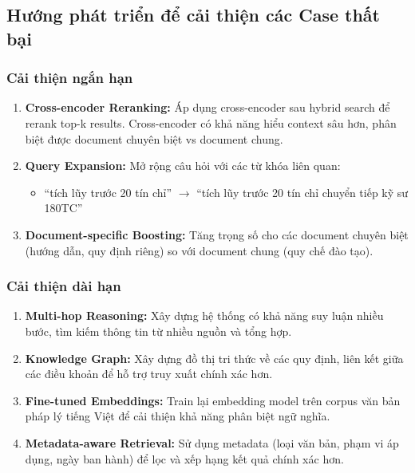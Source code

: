 \documentclass[../DoAn.tex]{subfiles}
\begin{document}
\subsection{Hướng phát triển để cải thiện các Case thất bại}

\subsubsection{Cải thiện ngắn hạn}
\begin{enumerate}
    \item \textbf{Cross-encoder Reranking:} Áp dụng cross-encoder sau hybrid search để rerank top-k results. Cross-encoder có khả năng hiểu context sâu hơn, phân biệt được document chuyên biệt vs document chung.
    
    \item \textbf{Query Expansion:} Mở rộng câu hỏi với các từ khóa liên quan:
    \begin{itemize}
        \item ``tích lũy trước 20 tín chỉ'' $\rightarrow$ ``tích lũy trước 20 tín chỉ chuyển tiếp kỹ sư 180TC''
    \end{itemize}
    
    \item \textbf{Document-specific Boosting:} Tăng trọng số cho các document chuyên biệt (hướng dẫn, quy định riêng) so với document chung (quy chế đào tạo).
\end{enumerate}

\subsubsection{Cải thiện dài hạn}
\begin{enumerate}
    \item \textbf{Multi-hop Reasoning:} Xây dựng hệ thống có khả năng suy luận nhiều bước, tìm kiếm thông tin từ nhiều nguồn và tổng hợp.
    
    \item \textbf{Knowledge Graph:} Xây dựng đồ thị tri thức về các quy định, liên kết giữa các điều khoản để hỗ trợ truy xuất chính xác hơn.
    
    \item \textbf{Fine-tuned Embeddings:} Train lại embedding model trên corpus văn bản pháp lý tiếng Việt để cải thiện khả năng phân biệt ngữ nghĩa.
    
    \item \textbf{Metadata-aware Retrieval:} Sử dụng metadata (loại văn bản, phạm vi áp dụng, ngày ban hành) để lọc và xếp hạng kết quả chính xác hơn.
\end{enumerate}
\end{document}
